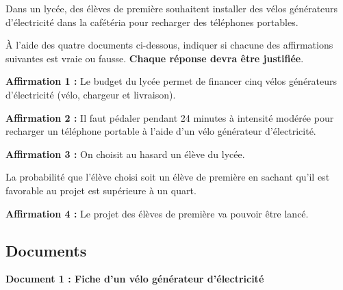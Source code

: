 Dans un lycée, des élèves de première souhaitent installer des vélos générateurs d'électricité dans la cafétéria pour recharger des téléphones portables.

	À l'aide des quatre documents ci-dessous, indiquer si chacune des affirmations suivantes est vraie ou fausse. \textbf{Chaque réponse devra être justifiée}.

	\bigskip

	\textbf{Affirmation 1 :} Le budget du lycée permet de financer cinq vélos générateurs d'électricité (vélo, chargeur et livraison).

	\bigskip

	\textbf{Affirmation 2 :} Il faut pédaler pendant 24 minutes à intensité modérée pour recharger un téléphone portable à l'aide d'un vélo générateur d'électricité.

	\bigskip

	\textbf{Affirmation 3 :} On choisit au hasard un élève du lycée.

	La probabilité que l'élève choisi soit un élève de première en sachant qu'il est favorable au projet est supérieure à un quart.

	\bigskip

	\textbf{Affirmation 4 :} Le projet des élèves de première va pouvoir être lancé.

	\subsection*{Documents}
	\textbf{Document 1 : Fiche d'un vélo générateur d'électricité}

	\begin{center}
	\end{center}


